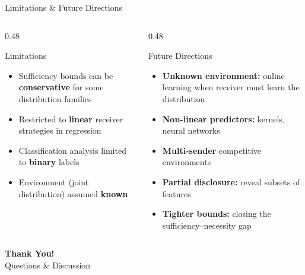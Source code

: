 \documentclass[aspectratio=169, 10pt]{beamer}
\begin{document}
\begin{frame}{Limitations \& Future Directions}
  \begin{columns}[T]
    \begin{column}{0.48\textwidth}
      \begin{alertblock}{\centering Limitations}
        \begin{itemize}
          \item Sufficiency bounds can be \textbf{conservative} for some distribution families
          \item Restricted to \textbf{linear} receiver strategies in regression
          \item Classification analysis limited to \textbf{binary} labels
          \item Environment (joint distribution) assumed \textbf{known}
        \end{itemize}
      \end{alertblock}
    \end{column}
    \begin{column}{0.48\textwidth}
      \begin{exampleblock}{\centering Future Directions}
        \begin{itemize}
          \item \textbf{Unknown environment:} online learning when receiver must learn the distribution
          \item \textbf{Non-linear predictors:} kernels, neural networks
          \item \textbf{Multi-sender} competitive environments
          \item \textbf{Partial disclosure:} reveal subsets of features
          \item \textbf{Tighter bounds:} closing the sufficiency--necessity gap
        \end{itemize}
      \end{exampleblock}
    \end{column}
  \end{columns}
\end{frame}

{
\begin{frame}
  \vfill
  \begin{center}
    {\Huge\color{white}\textbf{Thank You!}}\\[20pt]
    {\Large\color{accentCoral}Questions \& Discussion}\\[24pt]
  \end{center}
  \vfill
\end{frame}
}
\end{document}
